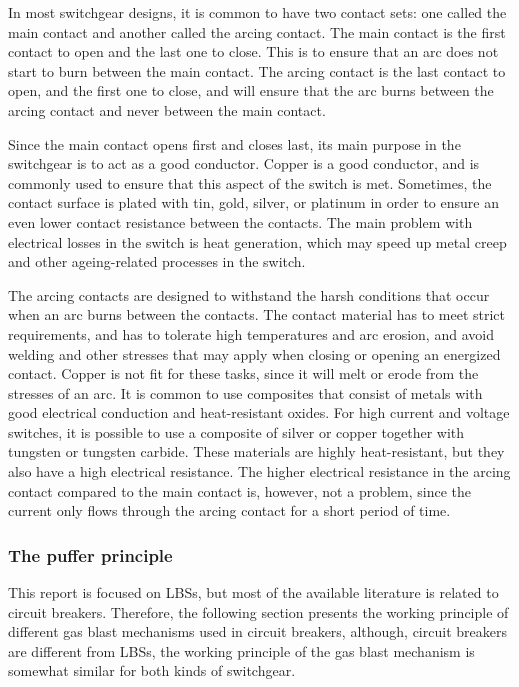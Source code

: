 \documentclass[10pt,b5paper,twoside]{article}
\begin{document}
In most switchgear designs, it is common to have two contact sets: one called the main contact and another called the arcing contact. The main contact is the first contact to open and the last one to close. This is to ensure that an arc does not start to burn between the main contact. The arcing contact is the last contact to open, and the first one to close, and will ensure that the arc burns between the arcing contact and never between the main contact.

Since the main contact opens first and closes last, its main purpose in the switchgear is to act as a good conductor. Copper is a good conductor, and is commonly used to ensure that this aspect of the switch is met. Sometimes, the contact surface is plated with tin, gold, silver, or platinum in order to ensure an even lower contact resistance between the contacts. The main problem with electrical losses in the switch is heat generation, which may speed up metal creep and other ageing-related processes in the switch.

The arcing contacts are designed to withstand the harsh conditions that occur when an arc burns between the contacts. The contact material has to meet strict requirements, and has to tolerate high temperatures and arc erosion, and avoid welding and other stresses that may apply when closing or opening an energized contact. Copper is not fit for these tasks, since it will melt or erode from the stresses of an arc. It is common to use composites that consist of metals with good electrical conduction and heat-resistant oxides. For high current and voltage switches, it is possible to use a composite of silver or copper together with tungsten or tungsten carbide. These materials are highly heat-resistant, but they also have a high electrical resistance. The higher electrical resistance in the arcing contact compared to the main contact is, however, not a problem, since the current only flows through the arcing contact for a short period of time.

\subsubsection{The puffer principle} \label{sec:puffer}
This report is focused on LBSs, but most of the available literature is related to circuit breakers. Therefore, the following section presents the working principle of different gas blast mechanisms used in circuit breakers, although, circuit breakers are different from LBSs, the working principle of the gas blast mechanism is somewhat similar for both kinds of switchgear.
\end{document}
